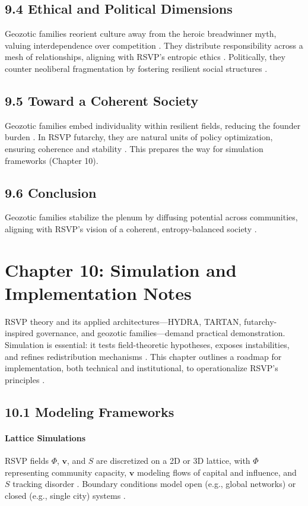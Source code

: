 \documentclass[12pt]{article}
\begin{document}
\subsection*{9.4 Ethical and Political Dimensions}
Geozotic families reorient culture away from the heroic breadwinner myth, valuing interdependence over competition \citep{ortega1957}. They distribute responsibility across a mesh of relationships, aligning with RSVP's entropic ethics \citep{whitehead1978}. Politically, they counter neoliberal fragmentation by fostering resilient social structures \citep{deleuze1987}.
\subsection*{9.5 Toward a Coherent Society}
Geozotic families embed individuality within resilient fields, reducing the founder burden \citep{zuboff2019}. In RSVP futarchy, they are natural units of policy optimization, ensuring coherence and stability \citep{hanson2003}. This prepares the way for simulation frameworks (Chapter 10).
\subsection*{9.6 Conclusion}
Geozotic families stabilize the plenum by diffusing potential across communities, aligning with RSVP's vision of a coherent, entropy-balanced society \citep{whitehead1978, deleuze1987}.
\section*{Chapter 10: Simulation and Implementation Notes}
RSVP theory and its applied architectures---HYDRA, TARTAN, futarchy-inspired governance, and geozotic families---demand practical demonstration. Simulation is essential: it tests field-theoretic hypotheses, exposes instabilities, and refines redistribution mechanisms \citep{bird1988}. This chapter outlines a roadmap for implementation, both technical and institutional, to operationalize RSVP's principles \citep{milewski2018}.
\subsection*{10.1 Modeling Frameworks}
\paragraph{Lattice Simulations}
RSVP fields \(\Phi\), \(\mathbf{v}\), and \(S\) are discretized on a 2D or 3D lattice, with \(\Phi\) representing community capacity, \(\mathbf{v}\) modeling flows of capital and influence, and \(S\) tracking disorder \citep{gromov1999}. Boundary conditions model open (e.g., global networks) or closed (e.g., single city) systems \citep{baez2011}.
\end{document}
